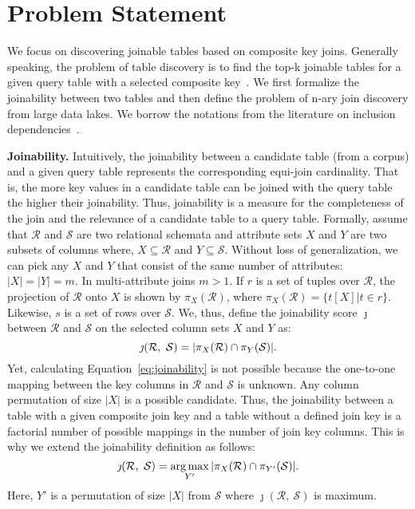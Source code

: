 
\section{Problem Statement}\label{sec:problem_statement}

We focus on discovering joinable tables based on composite key joins.
Generally speaking, the problem of table discovery is to find the top-k joinable tables for a given query table with a selected composite key~\cite{zhu2019josie}.
We first formalize the joinability between two tables and then define the problem of n-ary join discovery from large data lakes.
We borrow the notations from the literature on inclusion dependencies~\cite{papenbrock2015divide, de2009unary}.

\noindent\textbf{Joinability.} 
Intuitively, the joinability between a candidate table (from a corpus) and a given query table represents the corresponding equi-join cardinality.
That is, the more key values in a candidate table can be joined with the query table the higher their joinability.
Thus, joinability is a measure for the completeness of the join and the relevance of a candidate table to a query table.
Formally, assume that $\mathcal{R}$ and $\mathcal{S}$ are two relational schemata and attribute sets $X$ and $Y$ are two subsets of columns where, $X \subseteq \mathcal{R}$ and $Y \subseteq \mathcal{S}$. Without loss of generalization, we can pick any $X$ and $Y$ that consist of the same number of attributes: $|X| = |Y| = m$.
In multi-attribute joins $m > 1$. If $r$ is a set of tuples over $\mathcal{R}$, the projection of $\mathcal{R}$ onto $X$ is shown by $\pi_X(\mathcal{R})$, where $\pi_X(\mathcal{R}) = \{t[X]|t \in r\}$. 
Likewise, $s$ is a set of rows over $\mathcal{S}$.
We, thus, define the joinability score $\jmath$ between $\mathcal{R}$ and $\mathcal{S}$ on the selected column sets $X$ and $Y$ as:
\begin{equation}\label{eq:joinability}
\small
    \jmath(\mathcal{R},\ \mathcal{S}) = |\pi_X(\mathcal{R}) \cap \pi_Y(\mathcal{S})|.
\end{equation}
Yet, calculating Equation~\ref{eq:joinability} is not possible because the one-to-one mapping between the key columns in $\mathcal{R}$ and $\mathcal{S}$ is unknown.
Any column permutation of size $|X|$ is a possible candidate.
Thus, the joinability between a table with a given composite join key and a table without a defined join key is a factorial number of possible mappings in the number of join key columns.
This is why we extend the joinability definition as follows:
\begin{equation}
\small
    \jmath(\mathcal{R},\ \mathcal{S}) = \operatorname*{arg\,max}_{Y'} {|\pi_X(\mathcal{R}) \cap \pi_{Y'}(\mathcal{S})|}.
\end{equation}
Here, $Y'$ is a permutation of size $|X|$ from $\mathcal{S}$  where $\jmath(\mathcal{R},\ \mathcal{S})$ is maximum.

